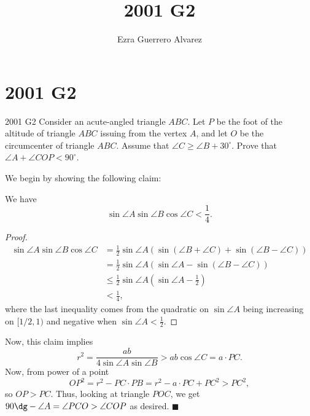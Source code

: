 \documentclass[14pt]{article}
\title{2001 G2}
\author{Ezra Guerrero Alvarez}
\begin{document}
\maketitle
	
\section*{2001 G2}

\begin{statement}{2001 G2}
	Consider an acute-angled triangle $ABC$. Let $P$ be the foot of the altitude of triangle $ABC$ issuing from the vertex $A$, and let $O$ be the circumcenter of triangle $ABC$. Assume that $\angle C \geq \angle B+30^{\circ}$. Prove that $\angle A+\angle COP < 90^{\circ}$.
\end{statement}
We begin by showing the following claim:
\begin{claim}
	We have
	\[ \sin\angle A\sin\angle B\cos\angle C<\frac14. \]
\end{claim}
\begin{proof}
	\begin{align*}
		\sin\angle A\sin\angle B\cos\angle C&=\frac12\sin\angle A(\sin(\angle B+\angle C)+\sin(\angle B-\angle C))\\
		&=\frac12\sin\angle A(\sin\angle A-\sin(\angle B-\angle C))\\
		&\le\frac12\sin\angle A\left(\sin\angle A-\frac12\right)\\
		&<\frac14,
	\end{align*}
where the last inequality comes from the quadratic on $\sin\angle A$ being increasing on $[1/2,1)$ and negative when $\sin\angle A<\frac12$.
\end{proof}
Now, this claim implies
\[ r^2=\frac{ab}{4\sin\angle A\sin\angle B}>ab\cos\angle C=a\cdot PC. \]
Now, from power of a point
\[ OP^2=r^2-PC\cdot PB=r^2-a\cdot PC+PC^2>PC^2, \]
so $OP>PC$. Thus, looking at triangle $POC$, we get $90\dg-\angle A=\angle PCO>\angle COP$ as desired. $\blacksquare$
	
\end{document}
